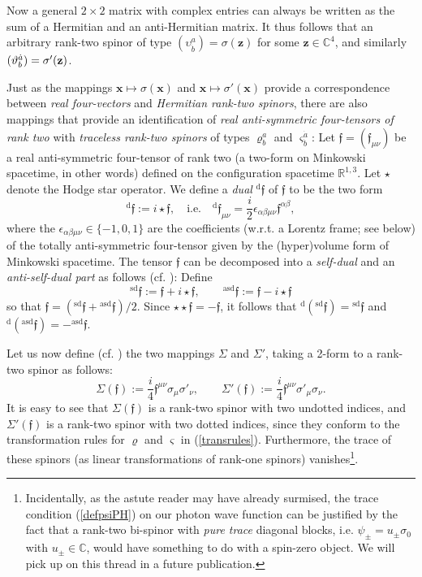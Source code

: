 \documentclass[11pt]{article}
\theoremstyle{definition}
\newcommand{\refeq}[1]{(\ref{#1})}
\numberwithin{equation}{section}
\newcommand{\ff}{\mathfrak{f}}
\newcommand{\bff}{\boldsymbol{\ff}}
\newcommand{\bx}{\mathbf{x}}
\newcommand{\bz}{\mathbf{z}}
\newcommand{\beq}{\begin{equation}}
\newcommand{\eeq}{\end{equation}}
\newcommand{\Cset}{{\mathbb C}}
\newcommand{\Rset}{{\mathbb R}}
\newcommand{\ep}{\epsilon}
\newcommand{\si}{\sigma}
\newcommand{\Si}{\Sigma}
\newcommand{\sdf}{{}^{\mathrm{sd}}\bff}
\newcommand{\asdf}{{}^{\mathrm{asd}}\bff}
\begin{document}
 Now a general $2\times 2$ matrix with complex entries can always be written as the sum of a Hermitian and an anti-Hermitian matrix. 
 It thus follows that an arbitrary rank-two spinor of type $(\upsilon^a_{\dot{b}}) = \si(\bz)$ for some $\bz \in \Cset^4$, and similarly 
$(\vartheta^{\dot{a}}_b) = \si\rq{}(\bz)$.

 Just as the mappings $\bx\mapsto \si(\bx)$ and $\bx\mapsto \si'(\bx)$ provide a correspondence between \emph{real four-vectors} and 
\emph{Hermitian rank-two spinors}, there are also mappings that provide an identification of 
\emph{real anti-symmetric four-tensors of rank two} with \emph{traceless rank-two spinors} of types $\varrho^a_b$ and
$\varsigma^{\dot{a}}_{\dot{b}}$: 
  Let  $\bff = (\ff_{\mu\nu})$ be a real anti-symmetric four-tensor of rank two (a two-form on Minkowski spacetime, 
in other words) defined on the configuration spacetime $\Rset^{1,3}$.
  Let $\star$ denote the Hodge star operator. 
We define a {\em dual} ${}^{\mathrm{d}}\bff$ of $\bff$ to be the two form 
\beq 
{}^{\mathrm{d}}\bff :=  i \star\bff,\quad{\mbox{i.e.}}\quad {}^{\mathrm{d}}\ff_{\mu\nu} = \frac{i}{2} \ep_{\alpha \beta \mu\nu} \ff^{\alpha\beta},
\eeq
where the $\ep_{\alpha \beta \mu\nu}\in\{-1,0,1\}$ are the coefficients (w.r.t. a Lorentz frame; see below) 
of the totally anti-symmetric four-tensor given by the (hyper)volume form of Minkowski spacetime.
 The tensor $\bff$ can be decomposed into a {\em self-dual} and an {\em anti-self-dual part} as follows (cf. \cite{Pen1976}): Define
\beq 
{}^{\mathrm{sd}}\bff := \bff + i \star\bff,\qquad {}^{\mathrm{asd}}\bff := \bff - i \star\bff
\eeq
so that $\bff = (\sdf + \asdf)/2$.
 Since $\star\star{\bff}=-\bff$, it follows that  ${}^{\mathrm{d}}\left(\sdf\right) = \sdf$ and ${}^{\mathrm{d}}\left(\asdf\right) = - \asdf $.

 Let us now define (cf. \cite{TamburiniVicino}) the two mappings $\Si$ and $\Si'$, taking a 2-form to a rank-two spinor as follows:
\beq \label{def:Siff}
\Si(\bff) := \frac{i}{4} \ff^{\mu\nu} \si_\mu \si'_\nu,\qquad 
\Si'(\bff) := \frac{i}{4} \ff^{\mu\nu} \si'_\mu \si_\nu.
\eeq
 It is easy to see that $\Si(\bff)$ is a rank-two spinor with two undotted indices, and $\Si'(\bff)$ is a rank-two spinor with two dotted 
indices, since they conform to the transformation rules for $\varrho$ and $\varsigma$ in \refeq{transrules}.
 Furthermore, the trace of these spinors (as linear transformations of rank-one spinors) vanishes\footnote{Incidentally, 
as the astute reader may have already surmised, the trace condition \refeq{defpsiPH} on our photon wave function can be 
justified by the fact that a rank-two bi-spinor with {\em pure trace} diagonal blocks, i.e. $\psi_\pm = u_\pm \si_0$ with 
$u_\pm \in \Cset$, would have something to do with a spin-zero object. We will pick up on this thread in a future publication.}.
\end{document}
